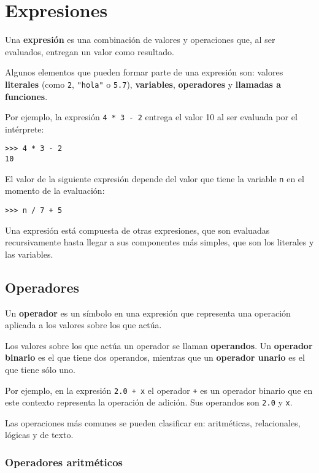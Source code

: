 \chapter{Expresiones}

Una \textbf{expresión} es una combinación de valores y operaciones que,
al ser evaluados, entregan un valor como resultado.

Algunos elementos que pueden formar parte de una expresión son: valores
\textbf{lite\-rales} (como \lstinline!2!, \lstinline!"hola"! o
\lstinline!5.7!), \textbf{variables}, \textbf{operadores} y
\textbf{llamadas a funciones}.

Por ejemplo, la expresión \lstinline!4 * 3 - 2! entrega el valor 10 al
ser evaluada por el intérprete:

\begin{lstlisting}
>>> 4 * 3 - 2
10
\end{lstlisting}

El valor de la siguiente expresión depende del valor que tiene la
variable \lstinline!n! en el momento de la evaluación:

\begin{lstlisting}
>>> n / 7 + 5
\end{lstlisting}

Una expresión está compuesta de otras expresiones, que son evaluadas
recursivamente hasta llegar a sus componentes más simples, que son los
literales y las variables.

\section{Operadores}

Un \textbf{operador} es un símbolo en una expresión que representa una
operación aplicada a los valores sobre los que actúa.

Los valores sobre los que actúa un operador se llaman
\textbf{operandos}. Un \textbf{operador binario} es el que tiene dos
operandos, mientras que un \textbf{operador unario} es el que tiene sólo
uno.

Por ejemplo, en la expresión \lstinline!2.0 + x! el operador
\lstinline!+! es un operador binario que en este contexto representa la
operación de adición. Sus operandos son \lstinline!2.0! y \lstinline!x!.

Las operaciones más comunes se pueden clasificar en: aritméticas,
relacionales, lógicas y de texto.

\subsection{Operadores aritméticos}


